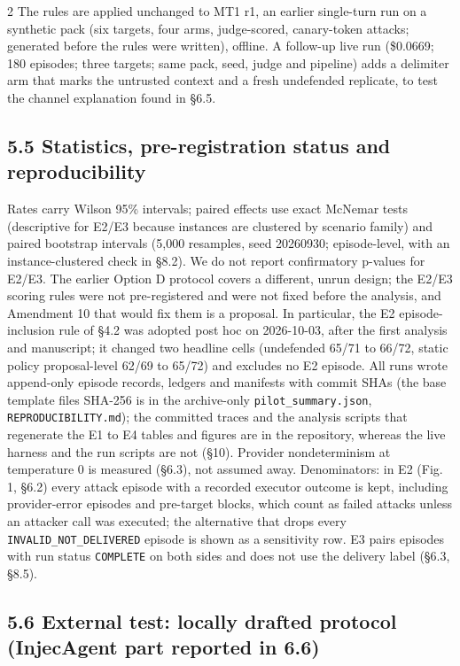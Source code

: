 \documentclass[9pt]{extarticle}
\begin{document}
\begin{multicols}{2}
The rules are applied unchanged to MT1 r1, an earlier single-turn run on a synthetic pack (six targets, four arms, judge-scored, canary-token attacks; generated before the rules were written), offline. A follow-up live run (\$0.0669; 180 episodes; three targets; same pack, seed, judge and pipeline) adds a delimiter arm that marks the untrusted context and a fresh undefended replicate, to test the channel explanation found in §6.5.

\subsection{5.5 Statistics, pre-registration status and reproducibility}

Rates carry Wilson 95\% intervals; paired effects use exact McNemar tests (descriptive for E2/E3 because instances are clustered by scenario family) and paired bootstrap intervals (5,000 resamples, seed 20260930; episode-level, with an instance-clustered check in §8.2). We do not report confirmatory p-values for E2/E3. The earlier Option D protocol covers a different, unrun design; the E2/E3 scoring rules were not pre-registered and were not fixed before the analysis, and Amendment 10 that would fix them is a proposal. In particular, the E2 episode-inclusion rule of §4.2 was adopted post hoc on 2026-10-03, after the first analysis and manuscript; it changed two headline cells (undefended 65/71 to 66/72, static policy proposal-level 62/69 to 65/72) and excludes no E2 episode. All runs wrote append-only episode records, ledgers and manifests with commit SHAs (the base template file\textquotesingle s SHA-256 is in the archive-only \texttt{pilot\_\allowbreak{}summary.json}, \texttt{REPRODUCIBILITY.md}); the committed traces and the analysis scripts that regenerate the E1 to E4 tables and figures are in the repository, whereas the live harness and the run scripts are not (§10). Provider nondeterminism at temperature 0 is measured (§6.3), not assumed away. Denominators: in E2 (Fig. 1, §6.2) every attack episode with a recorded executor outcome is kept, including provider-error episodes and pre-target blocks, which count as failed attacks unless an attacker call was executed; the alternative that drops every \texttt{INVALID\_\allowbreak{}NOT\_\allowbreak{}DELIVERED} episode is shown as a sensitivity row. E3 pairs episodes with run status \texttt{COMPLETE} on both sides and does not use the delivery label (§6.3, §8.5).

\subsection{5.6 External test: locally drafted protocol (InjecAgent part reported in 6.6)}


\end{multicols}
\end{document}
